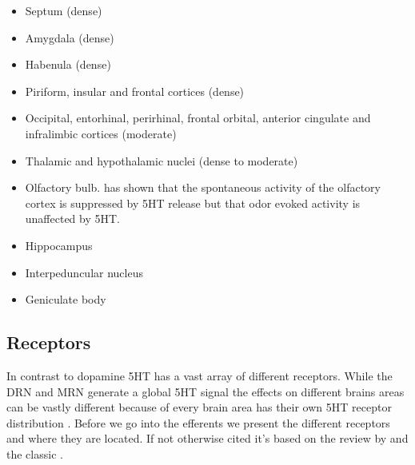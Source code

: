 \documentclass[12pt,a4paper]{article}
\begin{document}
\begin{itemize}
  \item Septum (dense)
  \item Amygdala (dense)
  \item Habenula (dense)
  \item Piriform, insular and frontal cortices (dense)
  \item Occipital, entorhinal, perirhinal, frontal orbital, anterior
    cingulate and infralimbic cortices (moderate)
  \item Thalamic and hypothalamic nuclei (dense to moderate)
  \item Olfactory bulb. \citep{Lottem2016} has shown that the
    spontaneous activity of the olfactory cortex is suppressed by 5HT
    release but that odor evoked activity is unaffected by 5HT.
  \item Hippocampus
  \item Interpeduncular nucleus
  \item Geniculate body
\end{itemize}

\subsection{Receptors}
In contrast to dopamine 5HT has a vast array of different
receptors. While the DRN and MRN generate a global 5HT signal the
effects on different brains areas can be vastly different because of
every brain area has their own 5HT receptor distribution
\citep{Palacios1990} \citep{Carhart-Harris2017}. Before we go into the
efferents we present the different receptors and where they are
located. If not otherwise cited it's based on the review by
\citep{Mengod2010} and the classic \citep{Palacios1990}.
\end{document}

